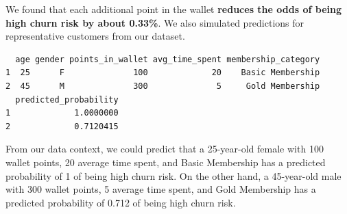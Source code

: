 \documentclass[
  letterpaper,
  DIV=11,
  numbers=noendperiod]{scrartcl}
\newenvironment{Shaded}{\begin{snugshade}}{\end{snugshade}}
\newcommand{\AttributeTok}[1]{\textcolor[rgb]{0.40,0.45,0.13}{#1}}
\newcommand{\DecValTok}[1]{\textcolor[rgb]{0.68,0.00,0.00}{#1}}
\newcommand{\FunctionTok}[1]{\textcolor[rgb]{0.28,0.35,0.67}{#1}}
\newcommand{\NormalTok}[1]{\textcolor[rgb]{0.00,0.23,0.31}{#1}}
\newcommand{\OtherTok}[1]{\textcolor[rgb]{0.00,0.23,0.31}{#1}}
\newcommand{\SpecialCharTok}[1]{\textcolor[rgb]{0.37,0.37,0.37}{#1}}
\newcommand{\StringTok}[1]{\textcolor[rgb]{0.13,0.47,0.30}{#1}}
\begin{document}
We found that each additional point in the wallet \textbf{reduces the
odds of being high churn risk by about 0.33\%}. We also simulated
predictions for representative customers from our dataset.

\begin{Shaded}
\end{Shaded}

\begin{verbatim}
  age gender points_in_wallet avg_time_spent membership_category
1  25      F              100             20    Basic Membership
2  45      M              300              5     Gold Membership
  predicted_probability
1             1.0000000
2             0.7120415
\end{verbatim}

From our data context, we could predict that a 25-year-old female with
100 wallet points, 20 average time spent, and Basic Membership has a
predicted probability of 1 of being high churn risk. On the other hand,
a 45-year-old male with 300 wallet points, 5 average time spent, and
Gold Membership has a predicted probability of 0.712 of being high churn
risk.
\end{document}
